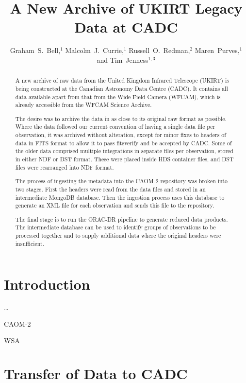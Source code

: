 \documentclass[11pt,twoside]{article}
\begin{document}
\title{A New Archive of UKIRT Legacy Data at CADC}
\author{Graham~S.~Bell,$^1$ Malcolm~J.~Currie,$^1$ Russell~O.~Redman,$^2$ Maren~Purves,$^1$ and Tim~Jenness$^{1,3}$
}

\begin{abstract}
A new archive of raw data from the United Kingdom Infrared
Telescope (UKIRT) is being constructed at the Canadian Astronomy
Data Centre (CADC).  It contains all data available apart from
that from the Wide Field Camera (WFCAM), which is already
accessible from the WFCAM Science Archive.

The desire was to archive the data in as close to its original raw
format as possible.  Where the data followed our current convention
of having a single data file per observation, it was archived
without alteration, except for minor fixes to headers of data in
FITS format to allow it to pass fitsverify and be accepted by CADC.
Some of the older data comprised multiple integrations in separate
files per observation, stored in either NDF or DST format. These
were placed inside HDS container files, and DST files were rearranged
into NDF format.

The process of ingesting the metadata into the CAOM-2 repository
was broken into two stages.  First the headers were read from
the data files and stored in an intermediate MongoDB database.
Then the ingestion process uses this database to generate an XML
file for each observation and sends this file to the repository.

The final stage is to run the ORAC-DR pipeline to generate reduced
data products.  The intermediate database can be used to identify
groups of observations to be processed together and to supply
additional data where the original headers were insufficient.
\end{abstract}

\section{Introduction}

\ldots

CAOM-2 \citep{2012ASPC..461..339D}

WSA \citep{2008MNRAS.384..637H}

\section{Transfer of Data to CADC}
\end{document}
